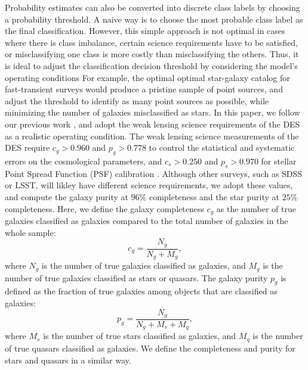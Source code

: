 \documentclass[fleqn,usenatbib]{mnras}
\begin{document}
Probability estimates can also be converted into discrete class labels by choosing a probability threshold.
A naive way is to choose the most probable class label as the final classification.
However, this simple approach is not optimal in cases where there is class imbalance,
certain science requirements have to be satisfied, or misclassifying one class is more costly than misclassifying the others.
Thus, it is ideal to adjust the classification decision threshold by considering the model's operating conditions
For example, the optimal optimal star-galaxy catalog for fast-transient surveys would produce a pristine sample of point sources, and
\citet{miller2017preparing} adjust the threshold to identify as many point sources as possible, while minimizing the number
of galaxies misclassified as stars.
In this paper, we follow our previous work \citep{kim2015hybrid}, and adopt the weak lensing science requirements of the DES
as a realistic operating condition.
The weak lensing science measurements of the DES require $c_g > 0.960$ and $p_g > 0.778$ to control the statistical and systematic errors
on the cosmological parameters, and $c_s > 0.250$ and $p_s > 0.970$ for stellar Point Spread Function (PSF) calibration
\citep{soumagnac2013star}.
Although other surveys, such as SDSS or LSST, will likley have different science requirements,
we adopt these values,
and compute the galaxy purity at $96\%$ completeness and the star purity at $25\%$ completeness.
Here, we define the galaxy completeness $c_g$ as the number of true galaxies classified as galaxies
compared to the total number of galaxies in the whole sample:
\begin{equation}
c_g = \frac{ N_g }{ N_g + M_g },
\end{equation}
where $N_g$ is the number of true galaxies classified as galaxies, and
$M_g$ is the number of true galaxies classified as stars or quasars.
The galaxy purity $p_g$ is defined as the fraction of true galaxies among objects that are classified as galaxies:
\begin{equation}
p_g = \frac{ N_g }{ N_g + M_s + M_q },
\end{equation}
where $M_s$ is the number of true stars classified as galaxies,
and $M_q$ is the number of true quasars classified as galaxies.
We define the completeness and purity for stars and quasars in a similar way.
\end{document}
